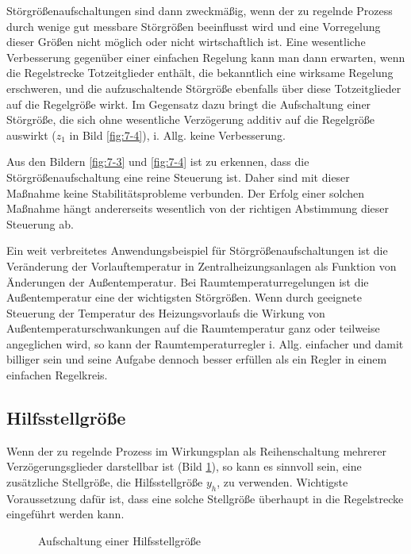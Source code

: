 Störgrößenaufschaltungen sind dann zweckmäßig, wenn der zu regelnde Prozess durch wenige gut messbare Störgrößen beeinflusst wird und eine Vorregelung dieser Größen nicht möglich oder nicht wirtschaftlich ist.
Eine wesentliche Verbesserung gegenüber einer einfachen Regelung kann man dann erwarten, wenn die Regelstrecke Totzeitglieder enthält, die bekanntlich eine wirksame Regelung erschweren, und die aufzuschaltende Störgröße ebenfalls über diese Totzeitglieder auf die Regelgröße wirkt.
Im Gegensatz dazu bringt die Aufschaltung einer Störgröße, die sich ohne wesentliche Verzögerung additiv auf die Regelgröße auswirkt (\(z_1\) in Bild \ref{fig:7-4}), i. Allg. keine Verbesserung.

Aus den Bildern \ref{fig:7-3} und \ref{fig:7-4} ist zu erkennen, dass die Störgrößenaufschaltung eine reine Steuerung ist.
Daher sind mit dieser Maßnahme keine Stabilitätsprobleme verbunden.
Der Erfolg einer solchen Maßnahme hängt andererseits wesentlich von der richtigen Abstimmung dieser Steuerung ab.

Ein weit verbreitetes Anwendungsbeispiel für Störgrößenaufschaltungen ist die Veränderung der Vorlauftemperatur in Zentralheizungsanlagen als Funktion von Änderungen der Außentemperatur.
Bei Raumtemperaturregelungen ist die Außentemperatur eine der wichtigsten Störgrößen.
Wenn durch geeignete Steuerung der Temperatur des Heizungsvorlaufs die Wirkung von Außentemperaturschwankungen auf die Raumtemperatur ganz oder teilweise angeglichen wird, so kann der Raumtemperaturregler i. Allg. einfacher und damit billiger sein und seine Aufgabe dennoch besser erfüllen als ein Regler in einem einfachen Regelkreis.


\subsection{Hilfsstellgröße}

Wenn der zu regelnde Prozess im Wirkungsplan als Reihenschaltung mehrerer Verzögerungsglieder darstellbar ist (Bild \ref{fig:7-5}), so kann es sinnvoll sein, eine zusätzliche Stellgröße, die Hilfsstellgröße \(y_h\), zu verwenden.
Wichtigste Voraussetzung dafür ist, dass eine solche Stellgröße überhaupt in die Regelstrecke eingeführt werden kann.

\begin{figure}[ht]
    \centering
    \caption{Aufschaltung einer Hilfsstellgröße}
    \label{fig:7-5}
\end{figure}


